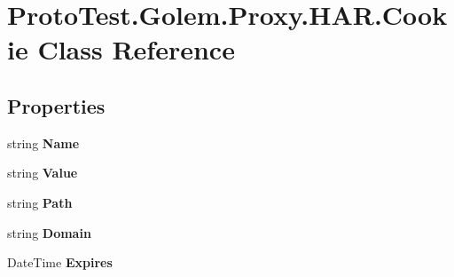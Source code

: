 \hypertarget{class_proto_test_1_1_golem_1_1_proxy_1_1_h_a_r_1_1_cookie}{\section{Proto\-Test.\-Golem.\-Proxy.\-H\-A\-R.\-Cookie Class Reference}
\label{class_proto_test_1_1_golem_1_1_proxy_1_1_h_a_r_1_1_cookie}
}
\subsection*{Properties}
\begin{DoxyCompactItemize}
\item 
\hypertarget{class_proto_test_1_1_golem_1_1_proxy_1_1_h_a_r_1_1_cookie_a9a63df410ed7139be36b0435cdbe7548}{string {\bfseries Name}}\label{class_proto_test_1_1_golem_1_1_proxy_1_1_h_a_r_1_1_cookie_a9a63df410ed7139be36b0435cdbe7548}

\item 
\hypertarget{class_proto_test_1_1_golem_1_1_proxy_1_1_h_a_r_1_1_cookie_a8a414e381843000fc1b863b41785bc74}{string {\bfseries Value}}\label{class_proto_test_1_1_golem_1_1_proxy_1_1_h_a_r_1_1_cookie_a8a414e381843000fc1b863b41785bc74}

\item 
\hypertarget{class_proto_test_1_1_golem_1_1_proxy_1_1_h_a_r_1_1_cookie_a8cdc460e163f5f381acc533a7242cf7f}{string {\bfseries Path}}\label{class_proto_test_1_1_golem_1_1_proxy_1_1_h_a_r_1_1_cookie_a8cdc460e163f5f381acc533a7242cf7f}

\item 
\hypertarget{class_proto_test_1_1_golem_1_1_proxy_1_1_h_a_r_1_1_cookie_a94ae0e62253d518b84f2304bd5d67a94}{string {\bfseries Domain}}\label{class_proto_test_1_1_golem_1_1_proxy_1_1_h_a_r_1_1_cookie_a94ae0e62253d518b84f2304bd5d67a94}

\item 
\hypertarget{class_proto_test_1_1_golem_1_1_proxy_1_1_h_a_r_1_1_cookie_a99b25fad6d26652ca8e4bb55d8a009d4}{Date\-Time {\bfseries Expires}}\label{class_proto_test_1_1_golem_1_1_proxy_1_1_h_a_r_1_1_cookie_a99b25fad6d26652ca8e4bb55d8a009d4}


\end{DoxyCompactItemize}
